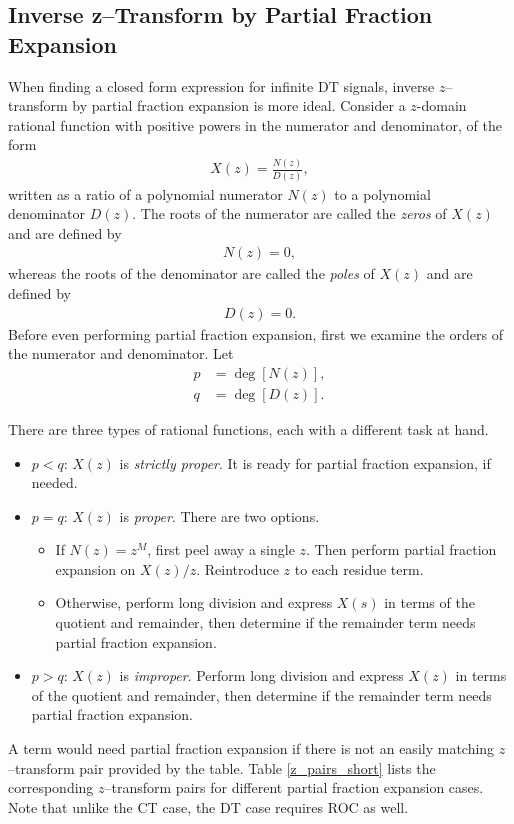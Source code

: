 \documentclass{report}
\begin{document}
\subsection{Inverse z--Transform by Partial Fraction Expansion}
When finding a closed form expression for infinite DT signals, inverse $z$--transform by partial fraction expansion is more ideal. 
Consider a $z$-domain rational function with positive powers in the numerator and denominator, of the form 
\begin{align}
    X(z) = \frac{N(z)}{D(z)},
\end{align}
written as a ratio of a polynomial numerator $N(z)$ to a polynomial denominator $D(z)$. 
The roots of the numerator are called the \emph{zeros} of $X(z)$ and are defined by 
\begin{align}
    N(z) = 0,
\end{align}
whereas the roots of the denominator are called the \emph{poles} of $X(z)$ and are defined by 
\begin{align}
    D(z) = 0.
\end{align}
Before even performing partial fraction expansion, first we examine the orders of the numerator and denominator. Let 
\begin{align}
    p &= \deg[N(z)], \\ 
    q &= \deg[D(z)].
\end{align}
\begin{tcolorbox}[width=\textwidth,colback={white}, sharp corners]
    There are three types of rational functions, each with a different task at hand.
    \begin{itemize}
        \item $p < q$: $X(z)$ is \emph{strictly proper}. It is ready for partial fraction expansion, if needed.
        \item $p = q$: $X(z)$ is \emph{proper}. There are two options. 
        \begin{itemize}
            \item If $N(z) = z^{M}$, first peel away a single $z$. Then perform partial fraction expansion on $X(z)/z$. Reintroduce $z$ to each residue term.
            \item Otherwise, perform long division and express $X(s)$ in terms of the quotient and remainder, then determine if the remainder term needs partial fraction expansion.
        \end{itemize}
        \item $p > q$: $X(z)$ is \emph{improper}. Perform long division and express $X(z)$ in terms of the quotient and remainder, then determine if the remainder term needs partial fraction expansion.
    \end{itemize}
\end{tcolorbox}
\noindent A term would need partial fraction expansion if there is not an easily matching $z$--transform pair provided by the table. Table \ref{z_pairs_short} lists the corresponding 
$z$--transform pairs for different partial fraction expansion cases. Note that unlike the CT case, the DT case requires ROC as well.
\end{document}
